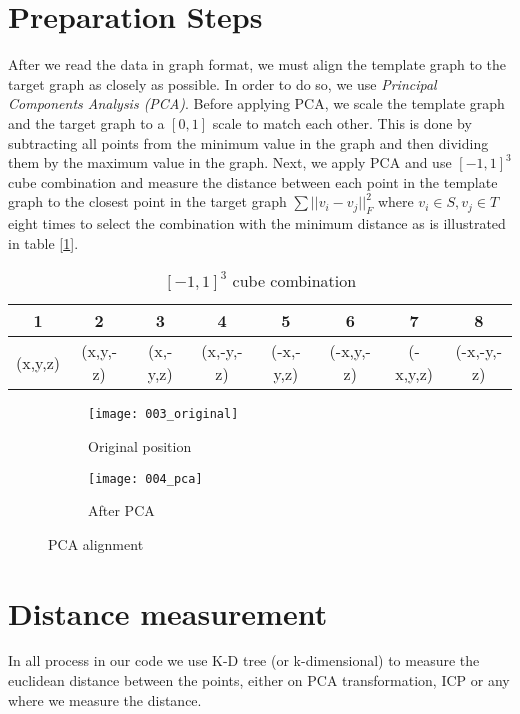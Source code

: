 \documentclass[../structure.tex]{subfiles}
\begin{document}
\section{Preparation Steps}
After we read the data in graph format, we must align the template graph to the target graph as closely as possible. In order to do so, we use \textit{Principal Components Analysis (PCA)}. Before applying PCA, we scale the template graph and the target graph to a $[0,1]$ scale to match each other. This is done by subtracting all points from the minimum value in the graph and then dividing them by the maximum value in the graph. Next, we apply PCA and use $[-1,1]^3$ cube combination and measure the distance between each point in the template graph to the closest point in the target graph $\sum ||v_i-v_j||_F^2$ where $v_i \in S, v_j \in T$ eight times to select the combination with the minimum distance as is illustrated in table [\ref{table:cube}].
\begin{center}
\begin{table}[h]
	\begin{tabular}{| c | c | c | c | c | c | c | c |}
	\hline
	1 & 2 & 3 & 4 & 5 & 6 & 7 & 8\\
	\hline
	(x,y,z) & (x,y,-z) & (x,-y,z) & (x,-y,-z) & (-x,-y,z) & (-x,y,-z) & (-x,y,z) & (-x,-y,-z)\\
	\hline
	\end{tabular}
\caption{$[-1,1]^3$ cube combination}
\label{table:cube}
\end{table}
\end{center}

\begin{figure}[h!]
	\centering
	\begin{subfigure}[b]{0.59\textwidth}
	\texttt{[image: 003\_original]}
	\caption{Original position}
	\end{subfigure}
	\begin{subfigure}[b]{0.39\textwidth}
	\texttt{[image: 004\_pca]}
	\caption{After PCA}
	\end{subfigure}
\label{fig:pca}
\caption{PCA alignment}
\end{figure}


\section{Distance measurement}
In all process in our code we use K-D tree (or k-dimensional)  to measure the euclidean distance between the points, either on PCA transformation, ICP or any where we measure the distance.
\end{document}

